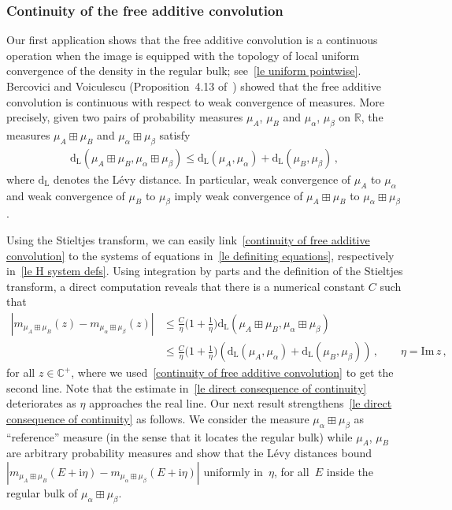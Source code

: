\documentclass[10pt,reqno]{amsart}
\numberwithin{equation}{section}
\theoremstyle{plain}
\numberwithin{kevin}{section}
\theoremstyle{remark}
\newcommand{\im}{\mathrm{Im}\,}
\newcommand{\R}{{\mathbb R }}
\newcommand{\C}{{\mathbb C}}
\newcommand{\ii}{\mathrm{i}}
\newcommand{\dL}{\mathrm{d}_{\mathrm{L}}}
\begin{document}
\subsubsection{Continuity of the free additive convolution}
Our first application shows that the free additive convolution is a continuous operation when the image is equipped with the topology of local uniform convergence of the density in the regular bulk; see~\eqref{le uniform pointwise}. Bercovici and Voiculescu (Proposition~4.13 of~\cite{BeV93}) showed that the free additive convolution is continuous with respect to weak convergence of measures. More precisely, given two pairs of probability measures $\mu_A$, $\mu_B$ and $\mu_\alpha$, $\mu_\beta$ on $\R$, the measures $\mu_A\boxplus\mu_B$ and $\mu_\alpha\boxplus\mu_\beta$ satisfy
\begin{align}\label{continuity of free additive convolution}
 \dL(\mu_A\boxplus\mu_B,\mu_\alpha\boxplus\mu_\beta)\le \dL(\mu_A,\mu_\alpha)+\dL(\mu_B,\mu_\beta)\,,
\end{align}
where $\dL$ denotes the L\'evy distance. In particular, weak convergence of $\mu_A$ to $\mu_\alpha$ and weak convergence of $\mu_B$ to $\mu_\beta$ imply weak convergence of $\mu_A\boxplus\mu_B$ to $\mu_\alpha\boxplus\mu_\beta$.

Using the Stieltjes transform, we can easily link~\eqref{continuity of free additive convolution} to the systems of equations in~\eqref{le definiting equations}, respectively in~\eqref{le H system defs}. Using integration by parts and the definition of the Stieltjes transform, a direct computation reveals that there is a numerical constant $C$ such that
\begin{align}\label{le direct consequence of continuity}
 |m_{\mu_{A}\boxplus\mu_{B}}(z)-m_{\mu_\alpha\boxplus\mu_\beta}(z)|&\le\frac{C}{\eta}\Big(1+\frac{1}{\eta}\Big) \dL(\mu_A\boxplus\mu_B,\mu_\alpha\boxplus\mu_\beta)\nonumber\\
 &\le\frac{C}{\eta}\Big(1+\frac{1}{\eta}\Big)(\dL(\mu_A,\mu_\alpha)+\dL(\mu_B,\mu_\beta))\,,\qquad \eta=\im z\,,
\end{align}
for all $z\in\C^+$, where we used~\eqref{continuity of free additive convolution} to get the second line. Note that the estimate in~\eqref{le direct consequence of continuity} deteriorates as $\eta$ approaches the real line. Our next result strengthens~\eqref{le direct consequence of continuity} as follows. We consider the measure $\mu_\alpha\boxplus\mu_\beta$ as ``reference'' measure  (in the sense that it locates the regular bulk) while $\mu_A$, $\mu_B$ are arbitrary probability measures and show that the L\'evy distances bound $|m_{\mu_{A}\boxplus\mu_{B}}(E+\ii\eta)-m_{\mu_\alpha\boxplus\mu_\beta}(E+\ii\eta)|$ uniformly in~$\eta$, for all~$E$ inside the regular bulk of	 $\mu_\alpha\boxplus\mu_\beta$. 
\end{document}
